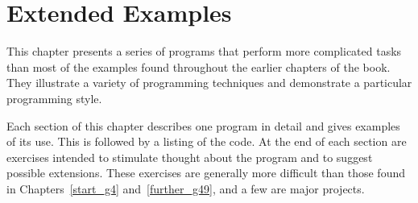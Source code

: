 \chapter{Extended Examples\label{examples_CHPTEXAMPLES}}
\label{examples_g151}
\label{examples_h0}
\begin{figure}[H]
\centering
\setlength{\fboxrule}{3pt}
\end{figure}
\clearpage





\label{examples_s0}This chapter presents a series of programs
that perform more complicated tasks than most of the examples
found throughout the earlier chapters of the book.
They illustrate a variety of programming techniques and demonstrate a
particular programming style.


Each section of this chapter describes one program in detail and gives
examples of its use.
This is followed by a listing of the code.
At the end of each section are exercises intended to stimulate thought
about the program and to suggest possible extensions.
These exercises are generally more difficult than those found in
Chapters \ref{start_g4} and \ref{further_g49}, and a few
are major projects.


